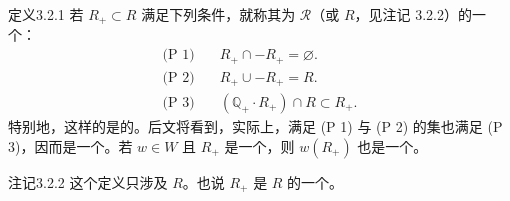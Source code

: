 \begin{SGAresult}{定义}{3.2.1}
若 $R_+\subset R$ 满足下列条件，就称其为 $\mathscr R$（或 $R$，见注记 3.2.2）的一个：
\begin{align*}
\text{(P 1)}&\quad R_+\cap-R_+=\varnothing.\\
\text{(P 2)}&\quad R_+\cup-R_+=R.\\
\text{(P 3)}&\quad(\mathbb Q_+\cdot R_+)\cap R\subset R_+.
\end{align*}
特别地，这样的是的。后文将看到，实际上，满足 (P 1) 与 (P 2) 的集也满足 (P 3)，因而是一个。若 $w\in W$ 且 $R_+$ 是一个，则 $w(R_+)$ 也是一个。
\end{SGAresult}
\begin{SGAresult}{注记}{3.2.2}
这个定义只涉及 $R$。也说 $R_+$ 是 $R$ 的一个。
\end{SGAresult}

